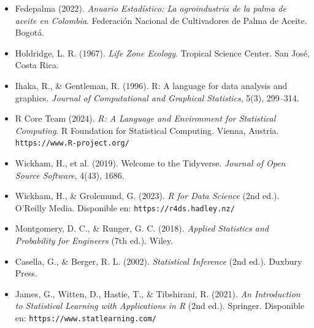 \documentclass[
  10pt,           %
  twoside,        %
  openright       %
]{book}
\begin{document}
\begin{itemize}
  \item Fedepalma (2022). \textit{Anuario Estadístico: La agroindustria de la palma de aceite en Colombia}. Federación Nacional de Cultivadores de Palma de Aceite. Bogotá.

  \item Holdridge, L. R. (1967). \textit{Life Zone Ecology}. Tropical Science Center. San José, Costa Rica.

  \item Ihaka, R., \& Gentleman, R. (1996). R: A language for data analysis and graphics. \textit{Journal of Computational and Graphical Statistics}, 5(3), 299--314.

  \item R Core Team (2024). \textit{R: A Language and Environment for Statistical Computing}. R Foundation for Statistical Computing. Vienna, Austria. \texttt{https://www.R-project.org/}

  \item Wickham, H., et al. (2019). Welcome to the Tidyverse. \textit{Journal of Open Source Software}, 4(43), 1686.

  \item Wickham, H., \& Grolemund, G. (2023). \textit{R for Data Science} (2nd ed.). O'Reilly Media. Disponible en: \texttt{https://r4ds.hadley.nz/}

  \item Montgomery, D. C., \& Runger, G. C. (2018). \textit{Applied Statistics and Probability for Engineers} (7th ed.). Wiley.

  \item Casella, G., \& Berger, R. L. (2002). \textit{Statistical Inference} (2nd ed.). Duxbury Press.

  \item James, G., Witten, D., Hastie, T., \& Tibshirani, R. (2021). \textit{An Introduction to Statistical Learning with Applications in R} (2nd ed.). Springer. Disponible en: \texttt{https://www.statlearning.com/}
\end{itemize}




\end{document}
